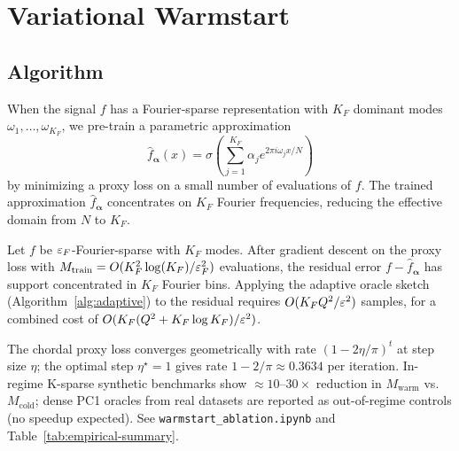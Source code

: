 \section{Variational Warmstart}
\label{sec:var}

\subsection{Algorithm}

When the signal $f$ has a Fourier-sparse representation with $K_F$ dominant modes $\omega_1,\ldots,\omega_{K_F}$, we pre-train a parametric approximation
\[
  \hat{f}_{\boldsymbol{\alpha}}(x) = \sigma\!\left(\sum_{j=1}^{K_F} \alpha_j e^{2\pi i \omega_j x/N}\right)
\]
by minimizing a proxy loss on a small number of evaluations of $f$.  The trained approximation $\hat{f}_{\boldsymbol{\alpha}}$ concentrates on $K_F$ Fourier frequencies, reducing the effective domain from $N$ to $K_F$.

\begin{theorem}\label{thm:var}
Let $f$ be $\varepsilon_F$-Fourier-sparse with $K_F$ modes.  After gradient descent on the proxy loss with $M_{\mathrm{train}} = O(K_F^2\log(K_F)/\varepsilon_F^2)$ evaluations, the residual error $f - \hat{f}_{\boldsymbol{\alpha}}$ has support concentrated in $K_F$ Fourier bins.  Applying the adaptive oracle sketch (Algorithm~\ref{alg:adaptive}) to the residual requires $O(K_F Q^2/\varepsilon^2)$ samples, for a combined cost of $O(K_F(Q^2 + K_F\log K_F)/\varepsilon^2)$.
\end{theorem}

The chordal proxy loss converges geometrically with rate $(1 - 2\eta/\pi)^t$ at step size $\eta$; the optimal step $\eta^\star=1$ gives rate $1-2/\pi \approx 0.3634$ per iteration.  In-regime K-sparse synthetic benchmarks show $\approx 10$--$30\times$ reduction in $M_{\mathrm{warm}}$ vs.\ $M_{\mathrm{cold}}$; dense PC1 oracles from real datasets are reported as out-of-regime controls (no speedup expected).  See \texttt{warmstart\_ablation.ipynb} and Table~\ref{tab:empirical-summary}.
